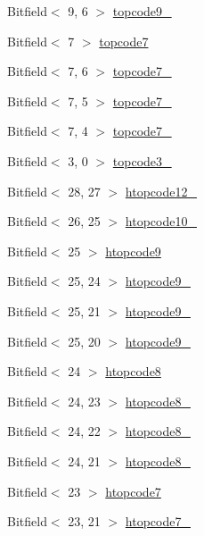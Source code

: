 \begin{DoxyCompactItemize}
Bitfield$<$ 9, 6 $>$ \hyperlink{namespaceArmISA_aabfd756b21e849f5ef34c8bd98536082}{topcode9\_}
\item 
Bitfield$<$ 7 $>$ \hyperlink{namespaceArmISA_a32ec0cd4ccee52f834b8d64a8d6ca1ca}{topcode7}
\item 
Bitfield$<$ 7, 6 $>$ \hyperlink{namespaceArmISA_a93caf1874e8a378bf4d757af8505a777}{topcode7\_}
\item 
Bitfield$<$ 7, 5 $>$ \hyperlink{namespaceArmISA_a3105c3d1b78440f0429186170a64918b}{topcode7\_}
\item 
Bitfield$<$ 7, 4 $>$ \hyperlink{namespaceArmISA_a4656bbd57184324c6a732c4815d4d26e}{topcode7\_}
\item 
Bitfield$<$ 3, 0 $>$ \hyperlink{namespaceArmISA_a37565a3b4740c73eec6d291b863d8e6b}{topcode3\_}
\item 
Bitfield$<$ 28, 27 $>$ \hyperlink{namespaceArmISA_ac19bd1685a0a71e1891a0fdb988cc893}{htopcode12\_}
\item 
Bitfield$<$ 26, 25 $>$ \hyperlink{namespaceArmISA_a95b59d6dfea05eb0b99c783efd411a99}{htopcode10\_}
\item 
Bitfield$<$ 25 $>$ \hyperlink{namespaceArmISA_aabcd0c6bd752d2f8643ba191756190a9}{htopcode9}
\item 
Bitfield$<$ 25, 24 $>$ \hyperlink{namespaceArmISA_a48ef6cc1f050beaf84f81040b8ba97e0}{htopcode9\_}
\item 
Bitfield$<$ 25, 21 $>$ \hyperlink{namespaceArmISA_adee2285380d2f495f25781ee540ee61d}{htopcode9\_}
\item 
Bitfield$<$ 25, 20 $>$ \hyperlink{namespaceArmISA_adb85c34aa88b70524ac7b39739e5980d}{htopcode9\_}
\item 
Bitfield$<$ 24 $>$ \hyperlink{namespaceArmISA_a7d338b33c4076045dd7e24d26e910cbc}{htopcode8}
\item 
Bitfield$<$ 24, 23 $>$ \hyperlink{namespaceArmISA_a8bb826d3f7da450b27816efd99913bf3}{htopcode8\_}
\item 
Bitfield$<$ 24, 22 $>$ \hyperlink{namespaceArmISA_a18d611aafa081d943f7170f1645b50ad}{htopcode8\_}
\item 
Bitfield$<$ 24, 21 $>$ \hyperlink{namespaceArmISA_a889e7ff72162795576cffc906fa01f4f}{htopcode8\_}
\item 
Bitfield$<$ 23 $>$ \hyperlink{namespaceArmISA_a2303d5a2d7e0caa5ec57642cb3eda531}{htopcode7}
\item 
Bitfield$<$ 23, 21 $>$ \hyperlink{namespaceArmISA_aae0bd83804d7d644373e272464b8428d}{htopcode7\_}
\item 

\end{DoxyCompactItemize}
